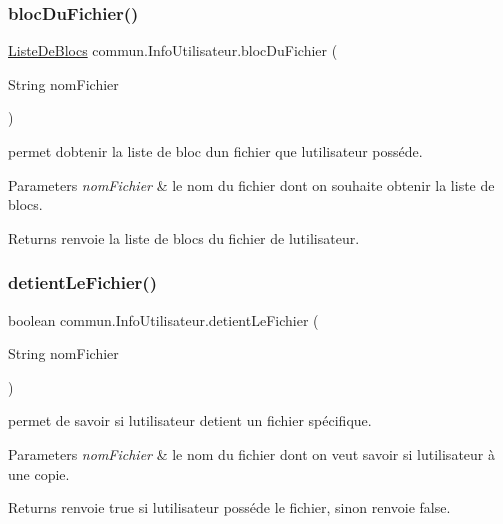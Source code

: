 \subsubsection{\texorpdfstring{bloc\+Du\+Fichier()}{blocDuFichier()}}
{\footnotesize\ttfamily \hyperlink{classcommun_1_1ListeDeBlocs}{Liste\+De\+Blocs} commun.\+Info\+Utilisateur.\+bloc\+Du\+Fichier (\begin{DoxyParamCaption}\item[{String}]{nom\+Fichier }\end{DoxyParamCaption})\hspace{0.3cm}{\ttfamily [inline]}}



permet d\textquotesingle{}obtenir la liste de bloc d\textquotesingle{}un fichier que l\textquotesingle{}utilisateur posséde. 


\begin{DoxyParams}{Parameters}
{\em nom\+Fichier} & le nom du fichier dont on souhaite obtenir la liste de blocs. \\
\hline
\end{DoxyParams}
\begin{DoxyReturn}{Returns}
renvoie la liste de blocs du fichier de l\textquotesingle{}utilisateur. 
\end{DoxyReturn}
\mbox{\label{classcommun_1_1InfoUtilisateur_ab120b90f5b5cf07fc6ebc9b34488e3b3}} 
\subsubsection{\texorpdfstring{detient\+Le\+Fichier()}{detientLeFichier()}}
{\footnotesize\ttfamily boolean commun.\+Info\+Utilisateur.\+detient\+Le\+Fichier (\begin{DoxyParamCaption}\item[{String}]{nom\+Fichier }\end{DoxyParamCaption})\hspace{0.3cm}{\ttfamily [inline]}}



permet de savoir si l\textquotesingle{}utilisateur detient un fichier spécifique. 


\begin{DoxyParams}{Parameters}
{\em nom\+Fichier} & le nom du fichier dont on veut savoir si l\textquotesingle{}utilisateur à une copie. \\
\hline
\end{DoxyParams}
\begin{DoxyReturn}{Returns}
renvoie true si l\textquotesingle{}utilisateur posséde le fichier, sinon renvoie false. 
\end{DoxyReturn}
\mbox{\label{classcommun_1_1InfoUtilisateur_acdf31d84ce570faa468b6bae8416e998}} 
